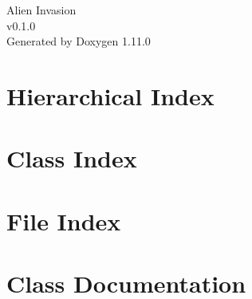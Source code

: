\documentclass[twoside]{book}
\newcommand{\+}{\discretionary{\mbox{\scriptsize$\hookleftarrow$}}{}{}}
\newcommand{\clearemptydoublepage}{%
    \newpage{\pagestyle{empty}\cleardoublepage}%
  }
\begin{document}
  \raggedbottom
    \hypersetup{pageanchor=false,
                bookmarksnumbered=true,
                pdfencoding=unicode
               }
  \begin{titlepage}
  \vspace*{7cm}
  \begin{center}%
  {\Large Alien Invasion}\\
  [1ex]\large v0.\+1.\+0 \\
  \vspace*{1cm}
  {\large Generated by Doxygen 1.11.0}\\
  \end{center}
  \end{titlepage}
  \clearemptydoublepage
  \tableofcontents
  \clearemptydoublepage
  \hypersetup{pageanchor=true}

\chapter{Hierarchical Index}

\chapter{Class Index}

\chapter{File Index}

\chapter{Class Documentation}



















\end{document}
